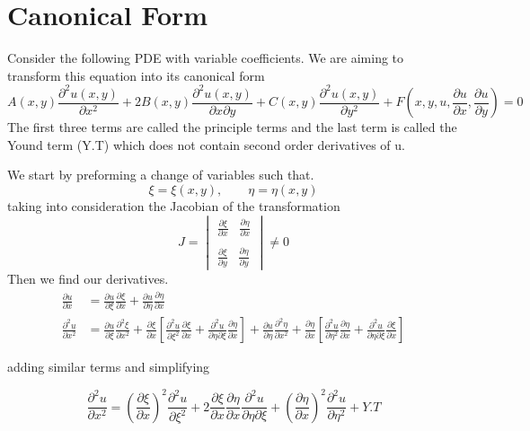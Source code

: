 \documentclass[]{article}
\begin{document}
\section{Canonical Form}
Consider the following PDE with variable coefficients. We are aiming to transform this equation into its canonical form
\begin{equation}
A\left(x,y\right)\frac{\partial^2 u\left(x,y\right)}{\partial x^2} + 2B\left(x,y\right)\frac{\partial^2 u\left(x,y\right)}{\partial x\partial y}+C\left(x,y\right)\frac{\partial^2 u\left(x,y\right)}{\partial y^2}+F\left(x,y,u,\frac{\partial u}{\partial x},\frac{\partial u}{\partial y}\right) = 0
\end{equation}
The first three terms are called the principle terms and the last term is called the Yound term (Y.T) which does not contain second order derivatives of u.
\par
We start by preforming a change of variables such that.
\[
    \xi = \xi\left(x,y\right),\quad\quad \eta = \eta\left(x,y\right)    
\]
taking into consideration the Jacobian of the transformation
\[
    J =\begin{vmatrix} \frac{\partial\xi}{\partial x}  \;\;\; \frac{\partial\eta}{\partial x} \\ \\ \frac{\partial\xi}{\partial y}\;\;\; \frac{\partial\eta}{\partial y} \end{vmatrix} \neq 0    
\]
Then we find our derivatives.
\begin{align*}
\frac{\partial u}{\partial x} &= \frac{\partial u}{\partial\xi}\frac{\partial\xi}{\partial x}+\frac{\partial u}{\partial\eta}\frac{\partial\eta}{\partial x}
\\
\frac{\partial^2 u}{\partial x^2} &= \frac{\partial u}{\partial\xi}\frac{\partial^2\xi}{\partial x^2}+\frac{\partial\xi}{\partial x}\left[\frac{\partial^2 u}{\partial\xi^2}\frac{\partial\xi}{\partial x}+\frac{\partial^2 u}{\partial\eta\partial\xi}\frac{\partial\eta}{\partial x}\right]+\frac{\partial u}{\partial\eta}\frac{\partial^2\eta}{\partial x^2}+\frac{\partial\eta}{\partial x}\left[\frac{\partial^2 u}{\partial\eta^2}\frac{\partial\eta}{\partial x}+\frac{\partial^2 u}{\partial\eta\partial\xi}\frac{\partial\xi}{\partial x}\right]
\end{align*}

adding similar terms and simplifying

\begin{equation}
\frac{\partial^2 u}{\partial x^2} = {(\frac{\partial\xi}{\partial x})}^2\frac{\partial^2 u}{\partial\xi^2}+2\frac{\partial\xi}{\partial x}\frac{\partial\eta}{\partial x}\frac{\partial^2 u}{\partial\eta\partial\xi}+{(\frac{\partial\eta}{\partial x})}^2\frac{\partial^2 u}{\partial\eta^2}+Y.T
\end{equation}
\end{document}
